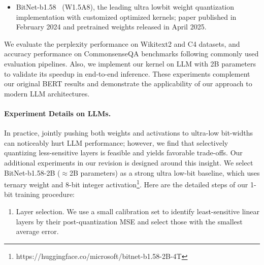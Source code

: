 \begin{revresponse}[]
\begin{itemize}
        \item BitNet-b1.58~\cite{wang2023bitnet} (W1.5A8), the leading ultra lowbit weight quantization implementation with customized optimized kernels; paper published in February 2024 and pretrained weights released in April 2025. %
    \end{itemize}
We evaluate the perplexity performance on Wikitext2 and C4 datasets, and accuracy performance on CommonsenseQA benchmarks following commonly used evaluation pipelines. Also, we implement our kernel on LLM with 2B parameters to validate its speedup in end-to-end inference. 
These experiments complement our original BERT results and demonstrate the applicability of our approach to modern LLM architectures. 


\paragraph{Experiment Details on LLMs.} In practice, jointly pushing both weights and activations to ultra-low bit-widths can noticeably hurt LLM performance; however, we find that selectively quantizing less-sensitive layers is feasible and yields favorable trade-offs. Our additional experiments in our revision is designed around this insight. 
We select {BitNet-b1.58-2B} ($\approx$2B parameters) as a strong ultra low-bit baseline, which uses ternary weight and 8-bit integer activation\footnote{https://huggingface.co/microsoft/bitnet-b1.58-2B-4T}. 
Here are the detailed steps of our 1-bit training procedure: 
\begin{enumerate}[label={Step \arabic* }, leftmargin=*]
    \item {Layer selection}. We use a small calibration set to identify least-sensitive linear layers by their post-quantization MSE and select those with the smallest average error. 


\end{enumerate}
\end{revresponse}
